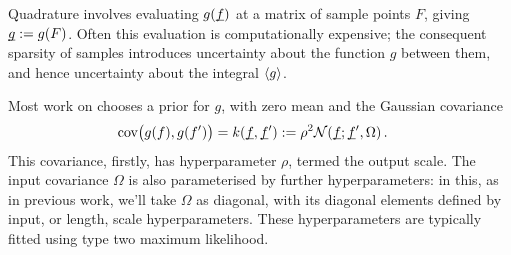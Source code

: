\documentclass[twoside]{article}
\begin{document}
Quadrature involves evaluating $g(\underline{\smash{f}})$ at a matrix of sample points $F$, giving $\underline{\smash{g}}:= g(F)$. Often this evaluation is computationally expensive; the consequent sparsity of samples introduces uncertainty about the function $g$ between them, and hence uncertainty about the integral $\langle g \rangle$.

Most work on \bq chooses a \gp prior for $g$, with zero mean and the Gaussian covariance 
\begin{align} \label{eq:Gaussian_cov_fn}
\text{cov}\bigl(g(f),g(f')\bigr)=k(\underline{\smash{f}},\underline{\smash{f}}') & := \rho^2 \mathcal{N}(\underline{\smash{f}};\underline{\smash{f}}',\Omega)\,.
\end{align} 
This covariance, firstly, has hyperparameter $\rho$, 
termed the output scale. The input covariance $\Omega$ is also parameterised by further hyperparameters: in this, as in previous work, we'll take $\Omega$ as diagonal, with its diagonal elements defined by input, or length, scale hyperparameters.  These hyperparameters are typically fitted using type two maximum likelihood.
\end{document}
